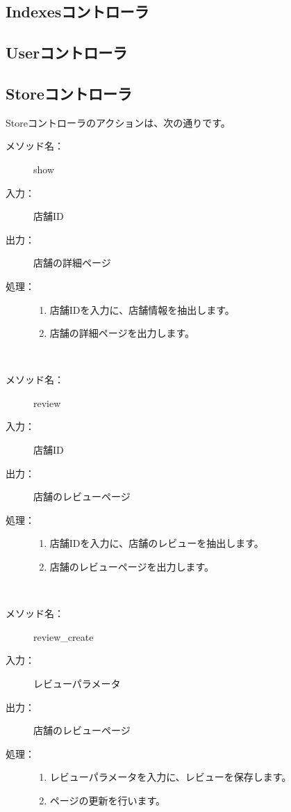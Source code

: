 \documentclass[a4j,titlepage]{jarticle}
\begin{document}
\subsection{Indexesコントローラ}


\subsection{Userコントローラ}


\subsection{Storeコントローラ}
Storeコントローラのアクションは、次の通りです。

\begin{description}
\item [メソッド名：] show
\item [入力：] 店舗ID
\item [出力：] 店舗の詳細ページ
\item [処理：]\mbox{}
  \begin{enumerate}
  \item 店舗IDを入力に、店舗情報を抽出します。
  \item 店舗の詳細ページを出力します。
  \end{enumerate}
\end{description}
​
\begin{description}
\item [メソッド名：] review
\item [入力：] 店舗ID
\item [出力：] 店舗のレビューページ
\item [処理：]\mbox{}
  \begin{enumerate}
  \item 店舗IDを入力に、店舗のレビューを抽出します。
  \item 店舗のレビューページを出力します。
  \end{enumerate}
\end{description}
​
\begin{description}
\item [メソッド名：] review\_create
\item [入力：] レビューパラメータ
\item [出力：] 店舗のレビューページ
\item [処理：]\mbox{}
  \begin{enumerate}
  \item レビューパラメータを入力に、レビューを保存します。
  \item ページの更新を行います。
  \end{enumerate}
\end{description}
\end{document}
